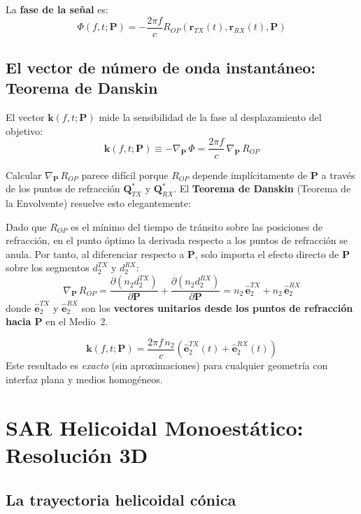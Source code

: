 \documentclass[12pt,a4paper,oneside]{book}
\newcommand{\result}[2]{%
  \begin{tcolorbox}[enhanced, breakable,
    colback=yellow!8, colframe=orange!70!black,
    fonttitle=\bfseries,
    title={\protect#1},
    attach boxed title to top left={yshift=-2mm, xshift=5mm},
    boxed title style={colback=orange!70!black}]
    #2
  \end{tcolorbox}}
\newcommand{\defin}[2]{%
  \begin{tcolorbox}[enhanced, breakable,
    colback=blue!5, colframe=blue!50!black,
    fonttitle=\bfseries,
    title={\protect#1}]
    #2
  \end{tcolorbox}}
\newcommand{\ROP}{R_{\!OP}}
\begin{document}
La \textbf{fase de la señal} es:
\[
\Phi(f,t;\mathbf{P}) = -\frac{2\pi f}{c}\ROP(\mathbf{r}_{TX}(t), \mathbf{r}_{RX}(t), \mathbf{P})
\]

\section{El vector de número de onda instantáneo: Teorema de Danskin}

El vector $\mathbf{k}(f,t;\mathbf{P})$ mide la sensibilidad de la fase al desplazamiento del objetivo:
\[
\mathbf{k}(f,t;\mathbf{P}) \equiv -\nabla_\mathbf{P}\,\Phi = \frac{2\pi f}{c}\,\nabla_\mathbf{P}\,\ROP
\]

Calcular $\nabla_\mathbf{P}\,\ROP$ parece difícil porque $\ROP$ depende implícitamente de $\mathbf{P}$ a través de los puntos de refracción $\mathbf{Q}_{TX}^*$ y $\mathbf{Q}_{RX}^*$. El \textbf{Teorema de Danskin} (Teorema de la Envolvente) resuelve esto elegantemente:

\defin{Teorema de Danskin aplicado a $\ROP$}{
Dado que $\ROP$ es el mínimo del tiempo de tránsito sobre las posiciones de refracción, en el punto óptimo la derivada respecto a los puntos de refracción se anula. Por tanto, al diferenciar respecto a $\mathbf{P}$, solo importa el efecto directo de $\mathbf{P}$ sobre los segmentos $d_2^{TX}$ y $d_2^{RX}$:
\[
\nabla_\mathbf{P}\,\ROP = \frac{\partial(n_2 d_2^{TX})}{\partial\mathbf{P}} + \frac{\partial(n_2 d_2^{RX})}{\partial\mathbf{P}} = n_2\,\hat{\mathbf{e}}_2^{TX} + n_2\,\hat{\mathbf{e}}_2^{RX}
\]
donde $\hat{\mathbf{e}}_2^{TX}$ y $\hat{\mathbf{e}}_2^{RX}$ son los \textbf{vectores unitarios desde los puntos de refracción hacia $\mathbf{P}$} en el Medio~2.
}

\result{Vector de Número de Onda Instantáneo}{
\[
\boxed{\mathbf{k}(f,t;\mathbf{P}) = \frac{2\pi f\,n_2}{c}\!\left(\hat{\mathbf{e}}_2^{TX}(t) + \hat{\mathbf{e}}_2^{RX}(t)\right)}
\]
Este resultado es \emph{exacto} (sin aproximaciones) para cualquier geometría con interfaz plana y medios homogéneos.
}

\chapter{SAR Helicoidal Monoestático: Resolución 3D}

\section{La trayectoria helicoidal cónica}
\end{document}

